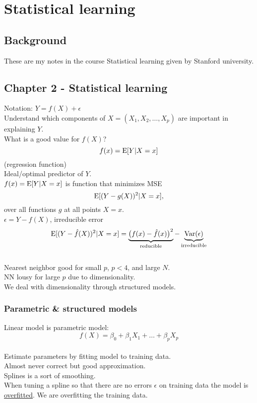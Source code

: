 \chapter{Statistical learning}

\section*{Background}
These are my notes in the course Statistical learning given by Stanford university.

\section*{Chapter 2 - Statistical learning}

Notation: $Y = f(X) + \epsilon$\\

Understand which components of $X = (X_1, X_2, \dots, X_p)$ are important in explaining $Y$.\\

What is a good value for $f(X)$?\\
\begin{equation}
f(x) = \operatorname*{E}[Y | X=x]
\end{equation}
(regression function)\\

Ideal/optimal predictor of $Y$.\\
$f(x)=\operatorname*{E}[Y|X=x]$ is function that minimizes MSE
\begin{equation*}
\operatorname*{E}[(Y-g(X))^2 | X=x],
\end{equation*}
over all functions $g$ at all points $X=x$.\\

$\epsilon = Y - f(X)$, irreducible error
\begin{equation}
\operatorname*{E}[(Y-\hat{f}(X))^2 | X=x] = \underbrace{\big(f(x)-\hat{f}(x)\big)^2}_\text{reducible} - \underbrace{\operatorname*{Var}(\epsilon)}_\text{irreducible}
\end{equation}\\

Nearest neighbor good for small $p$, $p<4$, and large $N$.\\
NN lousy for large $p$ due to dimensionality.\\
We deal with dimensionality through structured models.\\

\subsection*{Parametric \& structured models}
Linear model is parametric model:
\begin{equation}
f(X)=\beta_0+\beta_1X_1+\dots+\beta_pX_p
\end{equation}\\
Estimate parameters by fitting model to training data.\\
Almost never correct but good approximation.\\
Splines is a sort of smoothing.\\
When tuning a spline so that there are no errors $\epsilon$ on training data the model is \underline{overfitted}. We are overfitting the training data.\\


